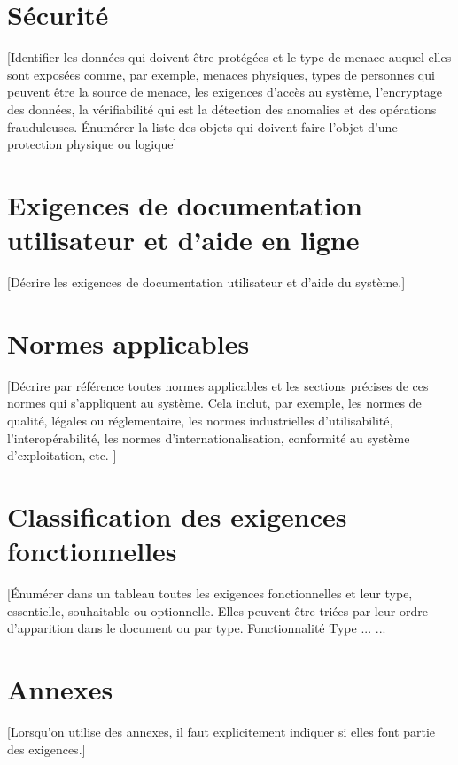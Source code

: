 \documentclass[10pt,a4paper]{report}
\begin{document}
\section{Sécurité}
[Identifier les données qui doivent être protégées et le type de menace auquel elles sont exposées comme, par exemple, menaces physiques, types de personnes qui peuvent être la source de menace, les exigences d’accès au système, l’encryptage des données, la vérifiabilité qui est la détection des anomalies et des opérations frauduleuses. 
Énumérer la liste des objets qui doivent faire l’objet d’une protection physique ou logique]


\section{Exigences de documentation utilisateur et d’aide en ligne}
[Décrire les exigences de documentation utilisateur et  d’aide du système.]


\section{Normes applicables}
[Décrire par référence toutes normes applicables et les sections précises de ces normes qui s’appliquent au système. Cela inclut, par exemple, les normes de qualité, légales ou réglementaire, les normes industrielles d’utilisabilité, l’interopérabilité, les normes d’internationalisation, conformité au système d’exploitation, etc. ]


\section{Classification des exigences fonctionnelles}
[Énumérer dans un tableau toutes les exigences fonctionnelles et leur type, essentielle, souhaitable ou optionnelle. Elles peuvent être triées par leur ordre d’apparition dans le document ou par type.
Fonctionnalité	Type
...	
...	


\section{Annexes}
[Lorsqu’on utilise des annexes, il faut explicitement indiquer si elles font partie des exigences.]
\end{document}
